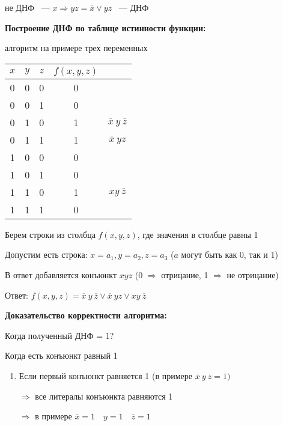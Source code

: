 \documentclass[russian]{lecture-notes}
\begin{document}
\begin{sloppypar}
\begin{example}
	не ДНФ ~--- $x \Rightarrow yz = \overline{x} \lor yz$ ~---  ДНФ
\end{example}

\textbf{Построение ДНФ по таблице истинности функции:}

	алгоритм на примере трех переменных

\begin{table}[h!]
	\centering
	\begin{tabular}{|c|c|c|c|c|}
		\hline
		$x$ & $y$ & $z$ & $f(x, y ,z)$ &     \\ \hline
		0 & 0 & 0 & 0 &     \\ \hline
		0 & 0 & 1 & 0 &     \\ \hline
		0 & 1 & 0 & 1 & $\overline{x} \: y \: \overline{z}$ \\ \hline
		0 & 1 & 1 & 1 & $\overline{x} \: yz$ \\ \hline
		1 & 0 & 0 & 0 &     \\ \hline
		1 & 0 & 1 & 0 &     \\ \hline
		1 & 1 & 0 & 1 & $xy \: \overline{z}$ \\ \hline
		1 & 1 & 1 & 0 &     \\ \hline
	\end{tabular}
\end{table}

	Берем строки из столбца $f(x, y, z)$, где значения в столбце равны 1
	
	Допустим есть строка: $x = a_1, y = a_2, z = a_3$ ($a$ могут быть как 0, так и 1)
	
	В ответ добавляется конъюнкт $xyz$ (0 $\Rightarrow$ отрицание, 1 $\Rightarrow$ не отрицание)
	
	Ответ: $f(x, y, z) = \overline{x} \: y \: \overline{z} \lor \overline{x} \: yz \lor xy \: \overline{z}$

\textbf{Доказательство корректности алгоритма:}

Когда полученный ДНФ = 1?

Когда есть конъюнкт равный 1

\begin{enumerate}
	\item{
		Если первый конъюнкт равняется 1 (в примере 	$\overline{x} \: y \: \overline{z}  = 1)$ 

		$\Rightarrow $ все литералы конъюнкта равняются 1

		$\Rightarrow$ в примере $\overline{x} = 1 \quad y = 1 \quad \overline{z} = 1$

}
\end{enumerate}
\end{sloppypar}
\end{document}
